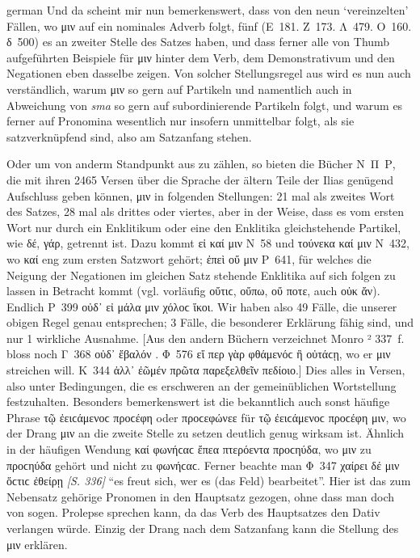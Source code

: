 \begin{otherlanguage*}{german}
Und da scheint mir nun bemerkenswert, dass von den neun ‘vereinzelten’ Fällen, wo μιν auf ein nominales Adverb folgt, fünf (Ε~181. Ζ~173. Λ~479. Ο~160. δ~500) es an zweiter Stelle des Satzes haben, und dass ferner alle von Thumb aufgeführten Beispiele für μιν hinter dem Verb, dem Demonstrativum und den Negationen eben dasselbe zeigen. Von solcher Stellungsregel aus wird es nun auch verständlich, warum μιν so gern auf Partikeln und namentlich auch in Abweichung von \emph{sma} so gern auf subordinierende Partikeln folgt, und warum es ferner auf Pronomina wesentlich nur insofern unmittelbar folgt, als sie satzverknüpfend sind, also am Satzanfang stehen.

Oder um von anderm Standpunkt aus zu zählen, so bieten die Bücher Ν~Π~Ρ, die mit ihren 2465 Versen über die Sprache der ältern Teile der Ilias genügend Aufschluss geben können, μιν in folgenden Stellungen: 21 mal als zweites Wort des Satzes, 28 mal als drittes oder viertes, aber in der Weise, dass es vom ersten Wort nur durch ein Enklitikum oder eine den Enklitika gleichstehende Partikel, wie δέ, γάρ, getrennt ist. Dazu kommt εἰ καί μιν Ν~58 und τούνεκα καί μιν Ν~432, wo καί eng zum ersten Satzwort gehört; ἐπεὶ οὔ μιν Ρ~641, für welches die Neigung der Negationen im gleichen Satz stehende Enklitika auf sich folgen zu lassen in Betracht kommt (vgl. vorläufig οὔτιϲ, οὔπω, οὔ ποτε, auch οὐκ ἄν). Endlich Ρ~399 οὐδ᾽ εἰ μάλα μιν χόλοϲ ἵκοι. Wir haben also 49 Fälle, die unserer obigen Regel genau entsprechen; 3 Fälle, die besonderer Erklärung fähig sind, und nur 1 wirkliche Ausnahme. [Aus den andern Büchern verzeichnet Monro ² 337~f. bloss noch Γ~368 οὐδ᾽ ἔβαλόν . Φ~576 εἴ περ γὰρ φθάμενόϲ  ἢ οὐτάϲῃ, wo er μιν streichen will. Κ~344 ἀλλ᾽ ἐῶμέν  πρῶτα παρεξελθεῖν πεδίοιο.] Dies alles in Versen, also unter Bedingungen, die es erschweren an der gemeinüblichen Wortstellung festzuhalten. Besonders bemerkenswert ist die bekanntlich auch sonst häufige Phrase τῷ  ἐειϲάμενοϲ προϲέφη oder προϲεφώνεε für τῷ ἐειϲάμενοϲ προϲέφη μιν, wo der Drang μιν an die zweite Stelle zu setzen deutlich genug wirksam ist. Ähnlich in der häufigen Wendung καί  φωνήϲαϲ ἔπεα πτερόεντα προϲηύδα, wo μιν zu προϲηύδα gehört und nicht zu φωνήϲαϲ. Ferner beachte man Φ~347 χαίρει δέ μιν ὅϲτιϲ ἐθείρῃ \hypertarget{p336}{\emph{[S. 336]}}\label{p336} “es freut sich, wer es (das Feld) bearbeitet”. Hier ist das zum Nebensatz gehörige Pronomen in den Hauptsatz gezogen, ohne dass man doch von sogen. Prolepse sprechen kann, da das Verb des Hauptsatzes den Dativ verlangen würde. Einzig der Drang nach dem Satzanfang kann die Stellung des μιν erklären.


\end{otherlanguage*}

